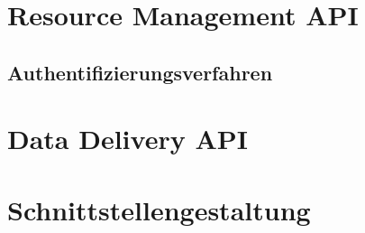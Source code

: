 \section{Resource Management API}
\label{sec:resourcemanagementapi}

\subsection{Authentifizierungsverfahren}
\label{subsec:authentifizierungsverfahren}

\section{Data Delivery API}
\label{sec:datadeliveryapi}


\section{Schnittstellengestaltung}
\label{sec:schnittstellengestaltung}

